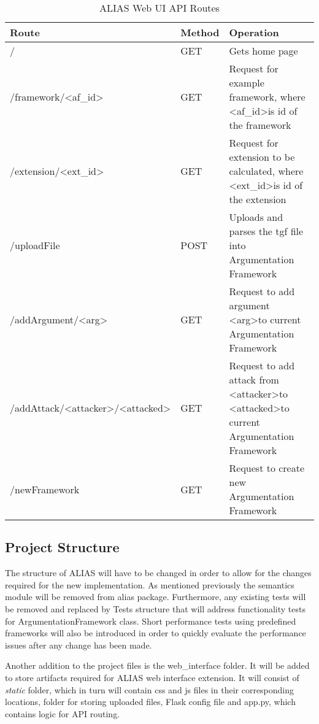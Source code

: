 \begin{table}[]
	\centering
		\begin{tabular}{|p{7cm}|p{1.5cm}|p{4.5cm}|}
			\hline
			\textbf{Route} & \textbf{Method} & \textbf{Operation}  \\ \hline \hline
			/ & GET & Gets home page \\ \hline
			/framework/\textless{}af\_id\textgreater{} & GET & Request for example framework, where \textless{}af\_id\textgreater is id of the framework \\ \hline
			/extension/\textless{}ext\_id\textgreater{} & GET & Request for extension to be calculated, where \textless{}ext\_id\textgreater is id of the extension \\ \hline
			/uploadFile & POST & Uploads and parses the tgf file into Argumentation Framework \\ \hline
			/addArgument/\textless{}arg\textgreater{} & GET & Request to add argument \textless{}arg\textgreater to current Argumentation Framework \\ \hline
			/addAttack/\textless{}attacker\textgreater{}/\textless{}attacked\textgreater{} & GET & Request to add attack from \textless{}attacker\textgreater to \textless{}attacked\textgreater to current Argumentation Framework \\ \hline
			/newFramework & GET & Request to create new Argumentation Framework \\ \hline
		\end{tabular}%
	\caption{ALIAS Web UI API Routes}
	\label{table:apiRoutes}
\end{table}

\subsection{Project Structure}
The structure of ALIAS will have to be changed in order to allow for the changes required for the new implementation. As mentioned previously the semantics module will be removed from alias package. Furthermore, any existing tests will be removed and replaced by Tests structure that will address functionality tests for ArgumentationFramework class. Short performance tests using predefined frameworks will also be introduced in order to quickly evaluate the performance issues after any change has been made.

Another addition to the project files is the web\_interface folder. It will be added to store artifacts required for ALIAS web interface extension. It will consist of \textit{static} folder, which in turn will contain css and js files in their corresponding locations, folder for storing uploaded files, Flask config file and app.py, which contains logic for API routing.

